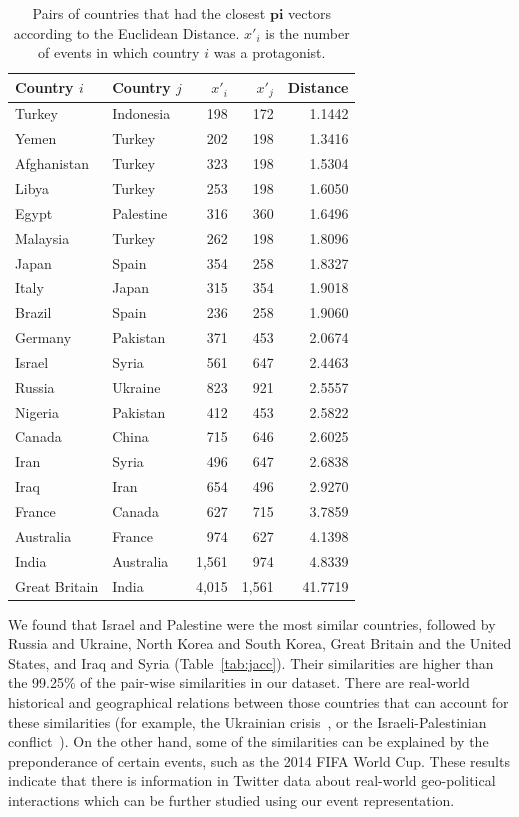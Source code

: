 \begin{table}
  \footnotesize
  \centering
\begin{tabular}{llrrr}
\toprule
Country $i$ & Country $j$ & $x'_i$ & $x'_j$ & Distance\\
\midrule
Turkey & Indonesia & 198 & 172 & 1.1442\\
Yemen & Turkey & 202 & 198 & 1.3416\\
Afghanistan & Turkey & 323 & 198 & 1.5304\\
Libya & Turkey & 253 & 198 & 1.6050\\
\addlinespace
Egypt & Palestine & 316 & 360 & 1.6496\\
Malaysia & Turkey & 262 & 198 & 1.8096\\
Japan & Spain & 354 & 258 & 1.8327\\
Italy & Japan & 315 & 354 & 1.9018\\
\addlinespace
Brazil & Spain & 236 & 258 & 1.9060\\
Germany & Pakistan & 371 & 453 & 2.0674\\
Israel & Syria & 561 & 647 & 2.4463\\
Russia & Ukraine & 823 & 921 & 2.5557\\
\addlinespace
Nigeria & Pakistan & 412 & 453 & 2.5822\\
Canada & China & 715 & 646 & 2.6025\\
Iran & Syria & 496 & 647 & 2.6838\\
Iraq & Iran & 654 & 496 & 2.9270\\
\addlinespace
France & Canada & 627 & 715 & 3.7859\\
Australia & France & 974 & 627 & 4.1398\\
India & Australia & 1,561 & 974 & 4.8339\\
Great Britain & India & 4,015 & 1,561 & 41.7719\\
\bottomrule
\end{tabular}
\caption[Similar countries in terms of participation vectors]{Pairs of countries
that had the closest $\mathbf{pi}$ vectors according to the Euclidean Distance.
$x'_i$ is the number of events in which country $i$ was a
protagonist.}\label{tab:euc}
\end{table}


We found that Israel and Palestine were the most similar countries, followed by
Russia and Ukraine, North Korea and South Korea, Great Britain and the United
States, and Iraq and Syria (Table~\ref{tab:jacc}). 
%
Their similarities are higher than the 99.25\% of the pair-wise similarities in
our dataset.
%
There are real-world historical and geographical relations between those
countries that can account for these similarities (for example, the Ukrainian
crisis~\cite{ukranian_crisis}, or the Israeli-Palestinian
conflict~\cite{israeli_palestinian}). 
%
On the other hand, some of the similarities can be explained by the
preponderance of certain events, such as the 2014 FIFA World Cup.
These results indicate that there is information in Twitter data about
real-world geo-political interactions which can be further studied using our
event representation.

